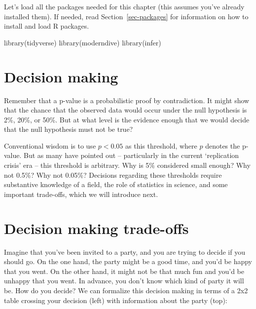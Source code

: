 \documentclass[
  letterpaper,
  DIV=11,
  numbers=noendperiod]{scrreprt}
\newenvironment{Shaded}{\begin{snugshade}}{\end{snugshade}}
\newcommand{\FunctionTok}[1]{\textcolor[rgb]{0.28,0.35,0.67}{#1}}
\newcommand{\NormalTok}[1]{\textcolor[rgb]{0.00,0.23,0.31}{#1}}
\theoremstyle{definition}
\theoremstyle{remark}
\begin{document}
Let's load all the packages needed for this chapter (this assumes you've
already installed them). If needed, read Section~\ref{sec-packages} for
information on how to install and load R packages.

\begin{Shaded}
\begin{Highlighting}[]
\FunctionTok{library}\NormalTok{(tidyverse)}
\FunctionTok{library}\NormalTok{(moderndive)}
\FunctionTok{library}\NormalTok{(infer)}
\end{Highlighting}
\end{Shaded}

\hypertarget{sec-decision-making}{%
\section{Decision making}\label{sec-decision-making}}

Remember that a p-value is a probabilistic proof by contradiction. It
might show that the chance that the observed data would occur under the
null hypothesis is 2\%, 20\%, or 50\%. But at what level is the evidence
enough that we would decide that the null hypothesis must not be true?

Conventional wisdom is to use \(p < 0.05\) as this threshold, where
\(p\) denotes the p-value. But as many have pointed out -- particularly
in the current `replication crisis' era -- this threshold is arbitrary.
Why is 5\% considered small enough? Why not 0.5\%? Why not 0.05\%?
Decisions regarding these thresholds require substantive knowledge of a
field, the role of statistics in science, and some important trade-offs,
which we will introduce next.

\hypertarget{sec-trade-offs}{%
\section{Decision making trade-offs}\label{sec-trade-offs}}

Imagine that you've been invited to a party, and you are trying to
decide if you should go. On the one hand, the party might be a good
time, and you'd be happy that you went. On the other hand, it might not
be that much fun and you'd be unhappy that you went. In advance, you
don't know which kind of party it will be. How do you decide? We can
formalize this decision making in terms of a 2x2 table crossing your
decision (left) with information about the party (top):
\end{document}
